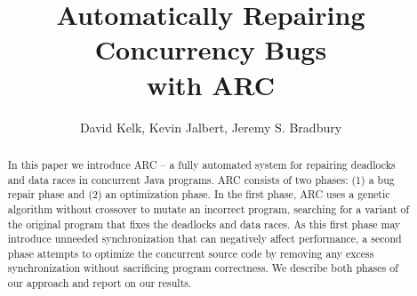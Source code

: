\documentclass[runningheads,a4paper]{llncs}
\begin{document}
\title{Automatically Repairing Concurrency Bugs\\ with ARC}


\author{David Kelk, Kevin Jalbert, Jeremy S. Bradbury}


\maketitle

\begin{abstract}

In this paper we introduce ARC -- a fully automated system for repairing deadlocks and data races in concurrent Java programs. ARC consists of two phases: (1) a bug repair phase and (2) an optimization phase. In the first phase, ARC uses a genetic algorithm without crossover to mutate an incorrect program, searching for a variant of the original program that fixes the deadlocks and data races. As this first phase may introduce unneeded synchronization that can negatively affect performance, a second phase attempts to optimize the concurrent source code by removing any excess synchronization without sacrificing program correctness. We describe both phases of our approach and report on our results.

\end{abstract}
\end{document}
